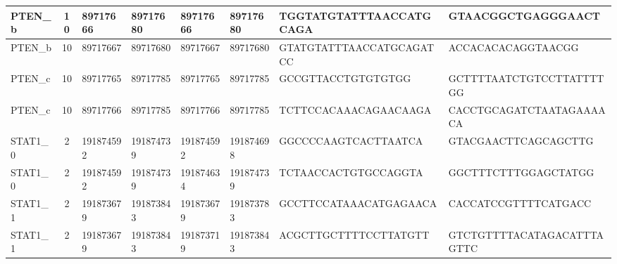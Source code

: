 \begin{landscape}
\begin{longtable}{| p{} | p{} | p{} | p{} | p{} | p{} | p{} | p{} |}
\multicolumn{1}{|l|}{PTEN\_b}    & \multicolumn{1}{c|}{10} & \multicolumn{1}{l|}{89717666}  & \multicolumn{1}{l|}{89717680}  & \multicolumn{1}{l|}{89717666}  & \multicolumn{1}{l|}{89717680}  & \multicolumn{1}{l|}{TGGTATGTATTTAACCATGCAGA}         & \multicolumn{1}{l|}{GTAACGGCTGAGGGAACT}            \\ \hline
\multicolumn{1}{|l|}{PTEN\_b}    & \multicolumn{1}{c|}{10} & \multicolumn{1}{l|}{89717667}  & \multicolumn{1}{l|}{89717680}  & \multicolumn{1}{l|}{89717667}  & \multicolumn{1}{l|}{89717680}  & \multicolumn{1}{l|}{GTATGTATTTAACCATGCAGATCC}        & \multicolumn{1}{l|}{ACCACACACAGGTAACGG}            \\ \hline
\multicolumn{1}{|l|}{PTEN\_c}    & \multicolumn{1}{c|}{10} & \multicolumn{1}{l|}{89717765}  & \multicolumn{1}{l|}{89717785}  & \multicolumn{1}{l|}{89717765}  & \multicolumn{1}{l|}{89717785}  & \multicolumn{1}{l|}{GCCGTTACCTGTGTGTGG}              & \multicolumn{1}{l|}{GCTTTTAATCTGTCCTTATTTTGG}      \\ \hline
\multicolumn{1}{|l|}{PTEN\_c}    & \multicolumn{1}{c|}{10} & \multicolumn{1}{l|}{89717766}  & \multicolumn{1}{l|}{89717785}  & \multicolumn{1}{l|}{89717766}  & \multicolumn{1}{l|}{89717785}  & \multicolumn{1}{l|}{TCTTCCACAAACAGAACAAGA}           & \multicolumn{1}{l|}{CACCTGCAGATCTAATAGAAAACA}      \\ \hline
\multicolumn{1}{|l|}{STAT1\_0}   & \multicolumn{1}{c|}{2}  & \multicolumn{1}{l|}{191874592} & \multicolumn{1}{l|}{191874739} & \multicolumn{1}{l|}{191874592} & \multicolumn{1}{l|}{191874698} & \multicolumn{1}{l|}{GGCCCCAAGTCACTTAATCA}            & \multicolumn{1}{l|}{GTACGAACTTCAGCAGCTTG}          \\ \hline
\multicolumn{1}{|l|}{STAT1\_0}   & \multicolumn{1}{c|}{2}  & \multicolumn{1}{l|}{191874592} & \multicolumn{1}{l|}{191874739} & \multicolumn{1}{l|}{191874634} & \multicolumn{1}{l|}{191874739} & \multicolumn{1}{l|}{TCTAACCACTGTGCCAGGTA}            & \multicolumn{1}{l|}{GGCTTTCTTTGGAGCTATGG}          \\ \hline
\multicolumn{1}{|l|}{STAT1\_1}   & \multicolumn{1}{c|}{2}  & \multicolumn{1}{l|}{191873679} & \multicolumn{1}{l|}{191873843} & \multicolumn{1}{l|}{191873679} & \multicolumn{1}{l|}{191873783} & \multicolumn{1}{l|}{GCCTTCCATAAACATGAGAACA}          & \multicolumn{1}{l|}{CACCATCCGTTTTCATGACC}          \\ \hline
\multicolumn{1}{|l|}{STAT1\_1}   & \multicolumn{1}{c|}{2}  & \multicolumn{1}{l|}{191873679} & \multicolumn{1}{l|}{191873843} & \multicolumn{1}{l|}{191873719} & \multicolumn{1}{l|}{191873843} & \multicolumn{1}{l|}{ACGCTTGCTTTTCCTTATGTT}           & \multicolumn{1}{l|}{GTCTGTTTTACATAGACATTTAGTTC}    \\ \hline

\end{longtable}
\end{landscape}
